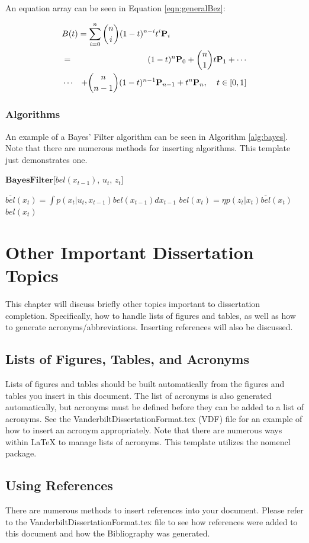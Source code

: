 \documentclass[10pt]{report}  %
\begin{document}
An equation array can be seen in Equation \ref{eqn:generalBez}: 

\begin{eqnarray}
\lefteqn{B(t) =  \sum_{i=0}^n \binom{n}{i} (1-t)^{n-i}t^{i}\mathbf{P}_i }\nonumber \\ 
& = & (1-t)^{n}\mathbf{P}_0 + \binom{n}{1}t\mathbf{P}_1+ \cdots  \nonumber \\
 &\cdots & + \binom{n}{n-1}(1-t)^{n-1}\mathbf{P}_{n-1} + t^{n}\mathbf{P}_n, \phantom{ttt} t \in [0,1]
\label{eqn:generalBez}
\end{eqnarray}

\subsection{Algorithms}
An example of a Bayes' Filter \citep*{Thrun2005} algorithm can be seen in Algorithm \ref{alg:bayes}. Note that there are numerous methods for inserting algorithms. This template just demonstrates one.

\begin{algorithm}{$\mathbf{Bayes Filter}$}[$bel(x_{t-1})$, $u_t$, $z_t$]
\caption{The Bayes filter algorithm.}
\label{alg:bayes}
\begin{algorithmic}[1]
\STATE $\overline{bel}(x_t) = \int p(x_t | u_t, x_{t-1}) bel(x_{t-1})dx_{t-1}$
\STATE $bel(x_t) = \eta p(z_t | x_t) \overline{bel}(x_t)$
\ENDFOR
\RETURN $bel(x_t)$
\end{algorithmic}
\end{algorithm}

\chapter{Other Important Dissertation Topics}
This chapter will discuss briefly other topics important to dissertation completion. Specifically, how to handle lists of figures and tables, as well as how to generate acronyms/abbreviations. Inserting references will also be discussed.

\section{ Lists of Figures, Tables, and Acronyms}
Lists of figures and tables should be built automatically from the figures and tables you insert in this document. The list of acronyms is also generated automatically, but acronyms must be defined before they can be added to a list of acronyms. See the  VanderbiltDissertationFormat.tex (VDF) file for an example of how to insert an acronym appropriately. Note that there are numerous ways within LaTeX to manage lists of acronyms. This template utilizes the nomencl package.

\section{Using References}
There are numerous methods to insert references into your document. Please refer to the VanderbiltDissertationFormat.tex file to see how references were added to this document and how the Bibliography was generated.

\singlespacing


\end{document}
